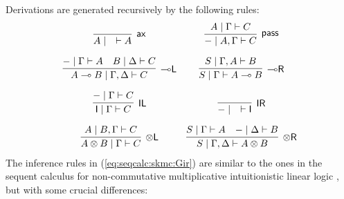 \documentclass[sn-mathphys-num]{sn-jnl}%
\newcommand{\GG}{\Gamma}
\newcommand{\GD}{\Delta}
\newcommand{\vd}{\vdash}
\newcommand{\tl}{\otimes \mathsf{L}}
\newcommand{\tr}{\otimes\mathsf{R}}
\newcommand{\pass}{\mathsf{pass}}
\newcommand{\unitl}{\mathsf{IL}}
\newcommand{\unitr}{\mathsf{IR}}
\newcommand{\ax}{\mathsf{ax}}
\newcommand{\ot}{\otimes}
\newcommand{\lolli}{\multimap}
\newcommand{\lleft}{{\lolli}\mathsf{L}}
\newcommand{\lright}{{\lolli}\mathsf{R}}
\newcommand{\unit}{\mathsf{I}}
\theoremstyle{thmstyleone}%
\theoremstyle{thmstyletwo}%
\theoremstyle{thmstylethree}%
\begin{document}
Derivations are generated recursively by the following rules:
\begin{equation}\label{eq:seqcalc:skmc:Gir}
  \begin{array}{cc}
    \infer[\ax]{A \mid \quad \vd A}{}
    &
    \infer[\pass]{{-} \mid A , \GG \vd C}{A \mid \GG \vd C}
    \\[10pt]
    \infer[\lleft]{A \lolli B \mid \GG , \GD \vd C}{
    {-} \mid \GG \vd A
    &
    B \mid \GD \vd C
    }
    &
    \infer[\lright]{S \mid \GG \vd A \lolli B}{S \mid \GG , A \vd B}
    \\[10pt]
    \infer[\unitl]{\unit \mid \GG \vd C}{{-} \mid \GG \vd C}
    &
    \infer[\unitr]{{-} \mid \quad \vd \unit}{}
    \\[10pt]
    \infer[\tl]{A \ot B \mid \GG \vd C}{A \mid B , \GG \vd C}
    &
    \infer[\tr]{S \mid \GG , \GD \vd A \ot B}{
    S \mid \GG \vd A
    &
    {-} \mid \GD \vd B
    }
  \end{array}
\end{equation}
The inference rules in (\ref{eq:seqcalc:skmc:Gir}) are similar to the ones in the sequent calculus for non-commutative multiplicative intuitionistic linear logic \cite{abrusci:noncommutative:1990}, but with some crucial differences: 
\end{document}
